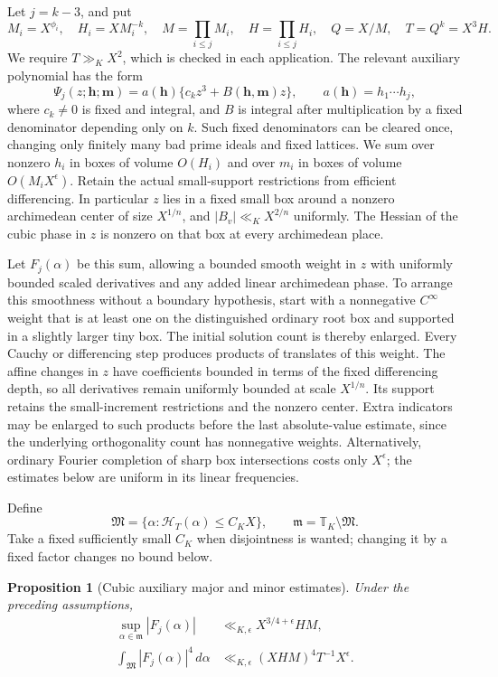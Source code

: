 \documentclass[11pt]{amsart}
\newtheorem{proposition}[theorem]{Proposition}
\theoremstyle{definition}
\numberwithin{equation}{section}
\begin{document}
Let $j=k-3$, and put
\[
 M_i=X^{\phi_i},\quad H_i=XM_i^{-k},\quad
 M=\prod_{i\le j}M_i,\quad H=\prod_{i\le j}H_i,\quad
 Q=X/M,\quad T=Q^k=X^3H.
\]
We require $T\gg_KX^2$, which is checked in each application.
The relevant auxiliary polynomial has the form
\[
 \Psi_j(z;\mathbf h;\mathbf m)
   =a(\mathbf h)\{c_k z^3+B(\mathbf h,\mathbf m)z\},\qquad
 a(\mathbf h)=h_1\cdots h_j,
\]
where $c_k\ne0$ is fixed and integral, and $B$ is integral after multiplication
by a fixed denominator depending only on $k$.  Such fixed denominators can be
cleared once, changing only finitely many bad prime ideals and fixed lattices.
We sum over nonzero $h_i$ in boxes of volume $O(H_i)$ and over $m_i$ in boxes
of volume $O(M_iX^\epsilon)$.  Retain the actual small-support restrictions
from efficient differencing.  In particular $z$ lies in a fixed small box
around a nonzero archimedean center of size $X^{1/n}$, and
$|B_v|\ll_KX^{2/n}$ uniformly.  The Hessian of the cubic phase in $z$ is
nonzero on that box at every archimedean place.

Let $F_j(\alpha)$ be this sum, allowing a bounded smooth weight in $z$ with
uniformly bounded scaled derivatives and any added linear archimedean phase.
To arrange this smoothness without a boundary hypothesis, start with a
nonnegative $C^\infty$ weight that is at least one on the distinguished
ordinary root box and supported in a slightly larger tiny box.  The initial
solution count is thereby enlarged.  Every Cauchy or differencing step
produces products of translates of this weight.  The affine changes in $z$
have coefficients bounded in terms of the fixed differencing depth, so
all derivatives remain uniformly bounded at scale $X^{1/n}$.  Its support
retains the small-increment restrictions and the nonzero center.  Extra
indicators may be enlarged to such products before the last absolute-value
estimate, since the underlying orthogonality count has nonnegative weights.
Alternatively, ordinary Fourier completion of sharp box intersections costs
only $X^\epsilon$; the estimates below are uniform in its linear frequencies.

Define
\[
 \mathfrak M=\{\alpha:\mathcal H_T(\alpha)\le C_KX\},\qquad
 \mathfrak m=\mathbb T_K\setminus\mathfrak M.
\]
Take a fixed sufficiently small $C_K$ when disjointness is wanted; changing
it by a fixed factor changes no bound below.

\begin{proposition}[Cubic auxiliary major and minor estimates]
\label{prop:g7-cubic}
Under the preceding assumptions,
\begin{align}
 \sup_{\alpha\in\mathfrak m}|F_j(\alpha)|
       &\ll_{K,\epsilon}X^{3/4+\epsilon}HM,
       \label{eq:g7-cubic-minor}\\
 \int_{\mathfrak M}|F_j(\alpha)|^4\,d\alpha
       &\ll_{K,\epsilon}(XHM)^4T^{-1}X^\epsilon.
       \label{eq:g7-cubic-major}
\end{align}
\end{proposition}
\end{document}
